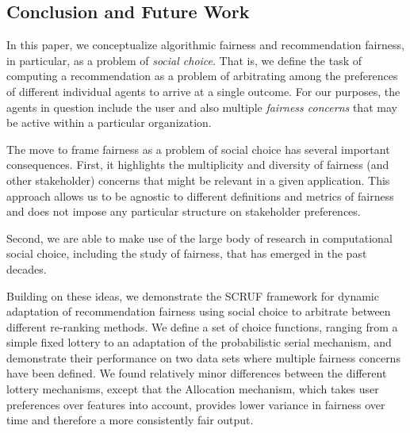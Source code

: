 \subsection{Conclusion and Future Work}
In this paper, we conceptualize algorithmic fairness and recommendation fairness, in particular, as a problem of \textit{social choice}. That is, we define the task of computing a recommendation as a problem of arbitrating among the preferences of different individual agents to arrive at a single outcome. For our purposes, the agents in question include the user and also multiple \textit{fairness concerns} that may be active within a particular organization. 

The move to frame fairness as a problem of social choice has several important consequences. First, it highlights the multiplicity and diversity of fairness (and other stakeholder) concerns that might be relevant in a given application. This approach allows us to be agnostic to different definitions and metrics of fairness and does not impose any particular structure on stakeholder preferences.

Second, we are able to make use of the large body of research in computational social choice, including the study of fairness, that has emerged in the past decades. 

Building on these ideas, we demonstrate the SCRUF framework for dynamic adaptation of recommendation fairness using social choice to arbitrate between different re-ranking methods. We define a set of choice functions, ranging from a simple fixed lottery to an adaptation of the probabilistic serial mechanism, and demonstrate their performance on two data sets where multiple fairness concerns have been defined. We found relatively minor differences between the different lottery mechanisms, except that the Allocation mechanism, which takes user preferences over features into account, provides lower variance in fairness over time and therefore a more consistently fair output.








